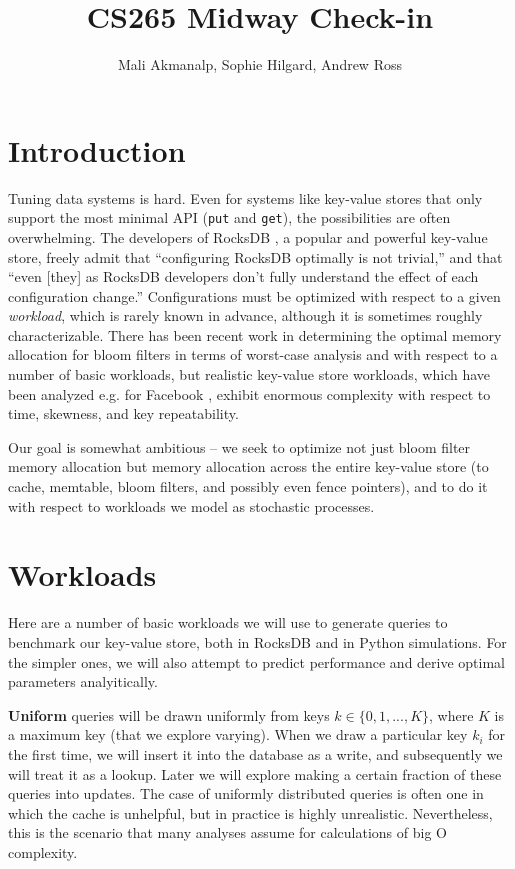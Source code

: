 \documentclass[11pt]{article}
\begin{document}
\title{CS265 Midway Check-in}
\author{Mali Akmanalp, Sophie Hilgard, Andrew Ross}
\maketitle

\section{Introduction}

Tuning data systems is hard. Even for systems like key-value stores that only support the most minimal API (\texttt{put} and \texttt{get}), the possibilities are often overwhelming. The developers of RocksDB \citep{rocksdb}, a popular and powerful key-value store, freely admit \citep{rocksdb-tuning-guide} that ``configuring RocksDB optimally is not trivial,'' and that ``even [they] as RocksDB developers don't fully understand the effect of each configuration change.'' Configurations must be optimized with respect to a given \textit{workload}, which is rarely known in advance, although it is sometimes roughly characterizable. There has been recent work \citep{monkey} in determining the optimal memory allocation for bloom filters in terms of worst-case analysis and with respect to a number of basic workloads, but realistic key-value store workloads, which have been analyzed e.g. for Facebook \citep{characterizing-memcached}, exhibit enormous complexity with respect to time, skewness, and key repeatability.

Our goal is somewhat ambitious -- we seek to optimize not just bloom filter memory allocation but memory allocation across the entire key-value store (to cache, memtable, bloom filters, and possibly even fence pointers), and to do it with respect to workloads we model as stochastic processes.

\section{Workloads}

Here are a number of basic workloads we will use to generate queries to benchmark our key-value store, both in RocksDB and in Python simulations. For the simpler ones, we will also attempt to predict performance and derive optimal parameters analyitically.

\textbf{Uniform} queries will be drawn uniformly from keys $k \in \{0,1,...,K\}$, where $K$ is a maximum key (that we explore varying). When we draw a particular key $k_i$ for the first time, we will insert it into the database as a write, and subsequently we will treat it as a lookup. Later we will explore making a certain fraction of these queries into updates. The case of uniformly distributed queries is often one in which the cache is unhelpful, but in practice is highly unrealistic. Nevertheless, this is the scenario that many analyses assume for calculations of big O complexity.
\end{document}
